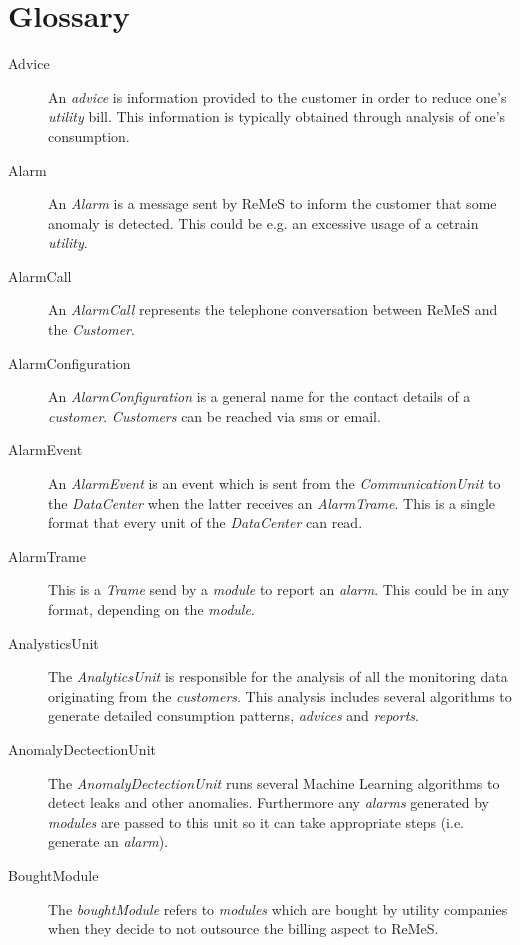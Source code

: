\chapter{Glossary}
\label{glossary}

\begin{description}
\item[Advice] An \emph{advice} is information provided to the customer in order
to reduce one's \emph{utility} bill. This information is typically obtained through
analysis of one's consumption.

\item[Alarm] An \emph{Alarm} is a message sent by ReMeS to inform the customer
that some anomaly is detected. This could be e.g. an excessive usage of a cetrain
\emph{utility}.

\item[AlarmCall] An \emph{AlarmCall} represents the telephone conversation
between ReMeS and the \emph{Customer}.

\item[AlarmConfiguration] An \emph{AlarmConfiguration} is a general name for the
contact details of a \emph{customer}. \emph{Customers} can be reached via sms or
email.

\item[AlarmEvent] An \emph{AlarmEvent} is an event which is sent from the
\emph{CommunicationUnit} to the \emph{DataCenter} when the latter receives an
\emph{AlarmTrame}. This is a single format that every unit of the
\emph{DataCenter} can read.

\item[AlarmTrame] This is a \emph{Trame} send by a \emph{module} to report an
\emph{alarm}. This could be in any format, depending on the \emph{module}.

\item[AnalysticsUnit] The \emph{AnalyticsUnit} is responsible for the analysis
of all the monitoring data originating from the \emph{customers}. This analysis
includes several algorithms to generate detailed consumption patterns,
\emph{advices} and \emph{reports}. 

\item[AnomalyDectectionUnit] The \emph{AnomalyDectectionUnit} runs several
Machine Learning algorithms to detect leaks and other anomalies. Furthermore any
\emph{alarms} generated by \emph{modules} are passed to this unit so it can take
appropriate steps (i.e. generate an \emph{alarm}).

\item[BoughtModule] The \emph{boughtModule} refers to \emph{modules} which are
bought by utility companies when they decide to not outsource the billing aspect
to ReMeS.


\end{description}
